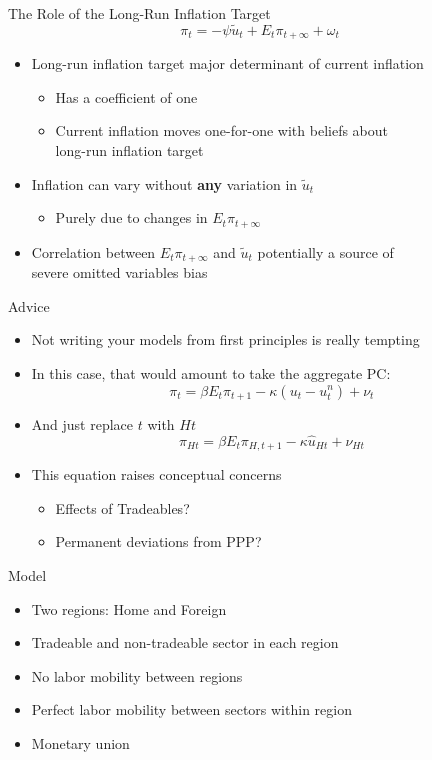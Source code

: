 \documentclass[english,xcolor=svgnames]{beamer}
\begin{document}
\begin{frame}{The Role of the Long-Run Inflation Target}
	\[ \pi_{t} = - \psi \tilde{u}_{t} + E_{t}\pi_{t+\infty} + \omega_t\] \vspace{-10pt}	
	\begin{itemize}
		\itemsep1em 
		\item Long-run inflation target major determinant of current inflation
		\begin{itemize}
			\item Has a coefficient of one
			\item Current inflation moves one-for-one with beliefs about \\ long-run inflation target
		\end{itemize}
		\item Inflation can vary without \textbf{any} variation in $\tilde{u}_{t}$
		\begin{itemize}
			\item Purely due to changes in $E_{t}\pi_{t+\infty}$ 
		\end{itemize}
		\item Correlation between $E_{t}\pi_{t+\infty}$ and $\tilde{u}_t$ potentially a source of \\ severe omitted variables bias
	\end{itemize}
\end{frame}	  

\begin{frame}{Advice}
\begin{itemize}
\item Not writing your models from first principles is really tempting
\item In this case, that would amount to take the aggregate PC:
	\[ \pi_{t} = \beta E_{t} \pi_{t+1} - \kappa (u_{t} - u_{t}^{n} ) + \nu_{t} \] \vspace{-10pt}
\item And just replace $t$ with  $Ht$  {\color{gray}{($H$ for Home)}}
		\[\pi_{Ht}=\beta E_{t}\pi_{H,t+1}-\kappa\hat{u}_{Ht} +  \nu_{Ht} \]
\item This equation raises conceptual concerns
\begin{itemize}
\item Effects of Tradeables?
\item Permanent deviations from PPP?
\end{itemize}
\end{itemize}
\end{frame}


\begin{frame}{Model}
	\begin{itemize}
		\itemsep1em 
		\item Two regions: Home and Foreign
		\item Tradeable and non-tradeable sector in each region
		\item No labor mobility between regions
		\item Perfect labor mobility between sectors within region
		\item Monetary union
	\end{itemize}
\end{frame}
\end{document}
